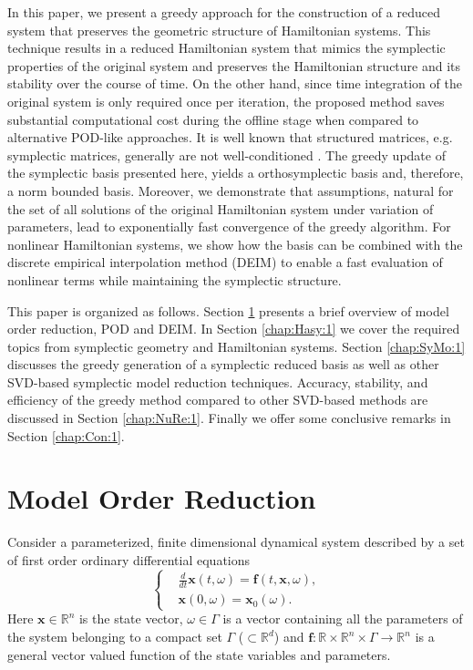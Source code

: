 \documentclass[final]{siamart}
\begin{document}
In this paper, we present a greedy approach for the construction of a reduced system that preserves the geometric structure of Hamiltonian systems. This technique results in a reduced Hamiltonian system that mimics the symplectic properties of the original system and preserves the Hamiltonian structure and its stability over the course of time. On the other hand, since time integration of the original system is only required once per iteration, the proposed method saves substantial computational cost during the offline stage when compared to alternative POD-like approaches. {{\color{black}} It is well known that structured matrices, e.g. symplectic matrices, generally are not well-conditioned \cite{Karow:2006cf}. The greedy update of the symplectic basis presented here, yields a orthosymplectic basis and, therefore, a norm bounded basis.} Moreover, we demonstrate that assumptions, natural for the set of all solutions of the original Hamiltonian system under variation of parameters, lead to exponentially fast convergence of the greedy algorithm. For nonlinear Hamiltonian systems, we show how the basis can be combined with the discrete empirical interpolation method (DEIM) {{\color{black}} \cite{Chaturantabut:2010cz,Barrault:2004kz}} to enable a fast evaluation of nonlinear terms while maintaining the symplectic structure.

This paper is organized as follows. Section \ref{chap:MoOr:1} presents a brief overview of model order reduction, POD and DEIM. In Section \ref{chap:Hasy:1} we cover the required topics from symplectic geometry and Hamiltonian systems. Section \ref{chap:SyMo:1} discusses the greedy generation of a symplectic reduced basis as well as other SVD-based symplectic model reduction techniques. Accuracy, stability, and efficiency of the greedy method compared to other SVD-based methods are discussed in Section \ref{chap:NuRe:1}. {{\color{black}} Finally we offer some conclusive remarks in Section \ref{chap:Con:1}}.

\section{Model Order Reduction} \label{chap:MoOr:1}
Consider a parameterized, finite dimensional dynamical system described by a set of first order ordinary differential equations
\begin{equation} \label{eq:MoOr:1}
\left\{
\begin{split}
& \frac{d}{dt} \mathbf{x}(t,\omega) = \mathbf f (t,\mathbf x,\omega), \\
& \mathbf x(0,\omega) = \mathbf x_0(\omega).
\end{split}
\right.
\end{equation}
Here $\mathbf x \in \mathbb R^n$ is the state vector, $\omega \in \Gamma$ is a vector containing all the parameters of the system {{\color{black}} belonging} to a compact set $\Gamma$ ($\subset \mathbb R^d$) and $\mathbf f : \mathbb R \times \mathbb R^n \times \Gamma \to \mathbb R^n$ is a general {{\color{black}} vector valued} function of the state variables and parameters.
\end{document}
